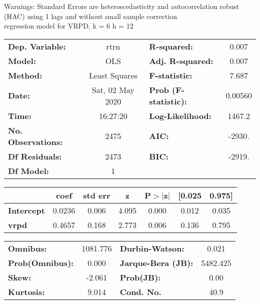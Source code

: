 Warnings: \newline
 [1] Standard Errors are heteroscedasticity and autocorrelation robust (HAC) using 1 lags and without small sample correction\\ 

regression model for VRPD, k = 6 h = 12\begin{center}
\begin{tabular}{lclc}
\toprule
\textbf{Dep. Variable:}    &       rtrn       & \textbf{  R-squared:         } &     0.007   \\
\textbf{Model:}            &       OLS        & \textbf{  Adj. R-squared:    } &     0.007   \\
\textbf{Method:}           &  Least Squares   & \textbf{  F-statistic:       } &     7.687   \\
\textbf{Date:}             & Sat, 02 May 2020 & \textbf{  Prob (F-statistic):} &  0.00560    \\
\textbf{Time:}             &     16:27:20     & \textbf{  Log-Likelihood:    } &    1467.2   \\
\textbf{No. Observations:} &        2475      & \textbf{  AIC:               } &    -2930.   \\
\textbf{Df Residuals:}     &        2473      & \textbf{  BIC:               } &    -2919.   \\
\textbf{Df Model:}         &           1      & \textbf{                     } &             \\
\bottomrule
\end{tabular}
\begin{tabular}{lcccccc}
                   & \textbf{coef} & \textbf{std err} & \textbf{z} & \textbf{P$> |$z$|$} & \textbf{[0.025} & \textbf{0.975]}  \\
\midrule
\textbf{Intercept} &       0.0236  &        0.006     &     4.095  &         0.000        &        0.012    &        0.035     \\
\textbf{vrpd}      &       0.4657  &        0.168     &     2.773  &         0.006        &        0.136    &        0.795     \\
\bottomrule
\end{tabular}
\begin{tabular}{lclc}
\textbf{Omnibus:}       & 1081.776 & \textbf{  Durbin-Watson:     } &    0.021  \\
\textbf{Prob(Omnibus):} &   0.000  & \textbf{  Jarque-Bera (JB):  } & 5482.425  \\
\textbf{Skew:}          &  -2.061  & \textbf{  Prob(JB):          } &     0.00  \\
\textbf{Kurtosis:}      &   9.014  & \textbf{  Cond. No.          } &     40.9  \\
\bottomrule
\end{tabular}
\end{center}

